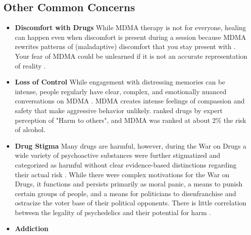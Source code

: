 \documentclass[12pt,letterpaper]{book}
\begin{document}
\subsection*{Other Common Concerns}
\begin{itemize}
    \item \textbf{Discomfort with Drugs}
        While MDMA therapy is not for everyone, healing can happen even when discomfort is present during a session because MDMA rewrites patterns of (maladaptive) discomfort that you stay present with \cite{fedduciaMDMAMemoryReconsolidation}. Your fear of MDMA could be unlearned if it is not an accurate representation of reality \cite{eckerUnlocking}.
    \item \textbf{Loss of Control}
        While engagement with distressing memories can be intense, people regularly have clear, complex, and emotionally nuanced conversations on MDMA \cite{colbertEvenings,passieHistory}. MDMA creates intense feelings of compassion and safety that make aggressive behavior unlikely. \textcite{nuttDrugHarms} ranked drugs by expert perception of "Harm to others", and MDMA was ranked at about 2\% the risk of alcohol.
    \item \textbf{Drug Stigma}
        Many drugs are harmful, however, during the War on Drugs a wide variety of psychoactive substances were further stigmatized and categorized as harmful without clear evidence-based distinctions regarding their actual risk \cite{alexanderNewJimCrow,nuttDrugHarms}. While there were complex motivations for the War on Drugs, it functions and persists primarily as moral panic, a means to punish certain groups of people, and a means for politicians to disenfranchise and ostracize the voter base of their political opponents. There is little correlation between the legality of psychedelics and their potential for harm \cite{nuttDrugHarms}.
    \item \textbf{Addiction}

\end{itemize}
\end{document}
